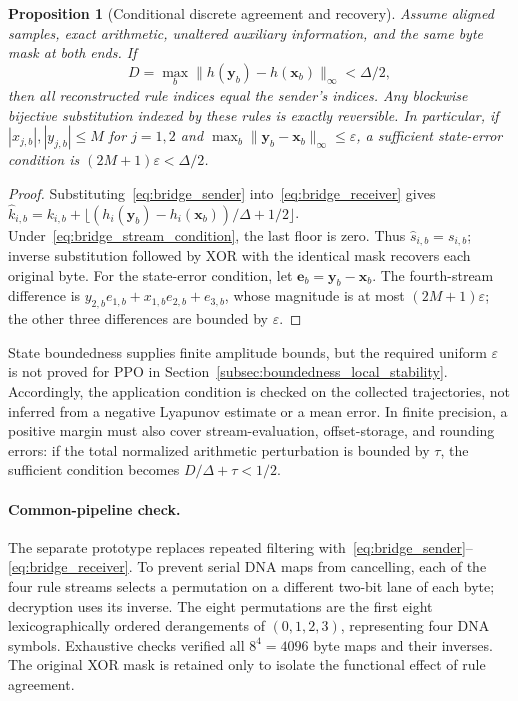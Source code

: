 \documentclass[a4paper,fleqn]{cas-dc}
\theoremstyle{plain}
\newtheorem{proposition}{Proposition}[section]
\theoremstyle{definition}
\begin{document}
\begin{proposition}[Conditional discrete agreement and recovery]
\label{prop:discrete_recovery}
Assume aligned samples, exact arithmetic, unaltered auxiliary information, and the same byte mask at both ends. If
\begin{equation}
 D=\max_b\|h(\mathbf{y}_b)-h(\mathbf{x}_b)\|_\infty<\Delta/2,
\label{eq:bridge_stream_condition}
\end{equation}
then all reconstructed rule indices equal the sender's indices. Any blockwise bijective substitution indexed by these rules is exactly reversible. In particular, if $|x_{j,b}|,|y_{j,b}|\leq M$ for $j=1,2$ and $\max_b\|\mathbf{y}_b-\mathbf{x}_b\|_\infty\leq\varepsilon$, a sufficient state-error condition is $(2M+1)\varepsilon<\Delta/2$.
\end{proposition}

\begin{proof}
Substituting~\eqref{eq:bridge_sender} into~\eqref{eq:bridge_receiver} gives $\widehat k_{i,b}=k_{i,b}+\lfloor (h_i(\mathbf{y}_b)-h_i(\mathbf{x}_b))/\Delta+1/2\rfloor$. Under~\eqref{eq:bridge_stream_condition}, the last floor is zero. Thus $\widehat s_{i,b}=s_{i,b}$; inverse substitution followed by XOR with the identical mask recovers each original byte. For the state-error condition, let $\mathbf{e}_b=\mathbf{y}_b-\mathbf{x}_b$. The fourth-stream difference is $y_{2,b}e_{1,b}+x_{1,b}e_{2,b}+e_{3,b}$, whose magnitude is at most $(2M+1)\varepsilon$; the other three differences are bounded by $\varepsilon$.
\end{proof}

State boundedness supplies finite amplitude bounds, but the required uniform $\varepsilon$ is not proved for PPO in Section~\ref{subsec:boundedness_local_stability}. Accordingly, the application condition is checked on the collected trajectories, not inferred from a negative Lyapunov estimate or a mean error. In finite precision, a positive margin must also cover stream-evaluation, offset-storage, and rounding errors: if the total normalized arithmetic perturbation is bounded by $\tau$, the sufficient condition becomes $D/\Delta+\tau<1/2$.

\paragraph{Common-pipeline check.}
The separate prototype replaces repeated filtering with~\eqref{eq:bridge_sender}--\eqref{eq:bridge_receiver}. To prevent serial DNA maps from cancelling, each of the four rule streams selects a permutation on a different two-bit lane of each byte; decryption uses its inverse. The eight permutations are the first eight lexicographically ordered derangements of $(0,1,2,3)$, representing four DNA symbols. Exhaustive checks verified all $8^4=4096$ byte maps and their inverses. The original XOR mask is retained only to isolate the functional effect of rule agreement.
\end{document}
